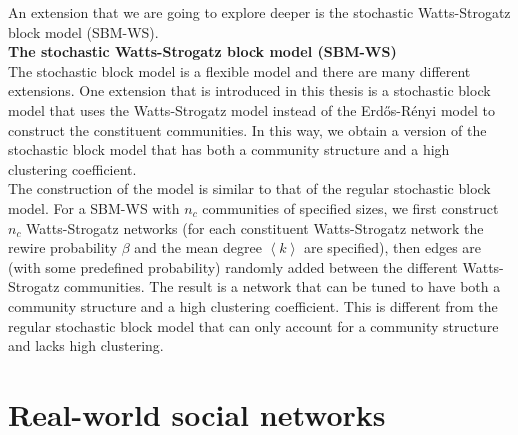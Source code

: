 \documentclass[11 pt , letterpaper , twoside , openright]{book}
\begin{document}
\newline
An extension that we are going to explore deeper is the stochastic Watts-Strogatz block model (SBM-WS).\\
\newline
\textbf{The stochastic Watts-Strogatz block model (SBM-WS)}\\
\newline
The stochastic block model is a flexible model and there are many different extensions. One extension that is introduced in this thesis is a stochastic block model that uses the Watts-Strogatz model instead of the Erd\H{o}s-R\'{e}nyi model to construct the constituent communities. In this way, we obtain a version of the stochastic block model that has both a community structure and a high clustering coefficient.\\
\newline
The construction of the model is similar to that of the regular stochastic block model. For a SBM-WS with $n_c$ communities of specified sizes, we first construct $n_c$ Watts-Strogatz networks (for each constituent Watts-Strogatz network the rewire probability $\beta$ and the mean degree $\left<k\right>$ are specified), then edges are (with some predefined probability) randomly added between the different Watts-Strogatz communities. The result is a network that can be tuned to have both a community structure and a high clustering coefficient. This is different from the regular stochastic block model that can only account for a community structure and lacks high clustering.

\section{Real-world social networks}
\end{document}
